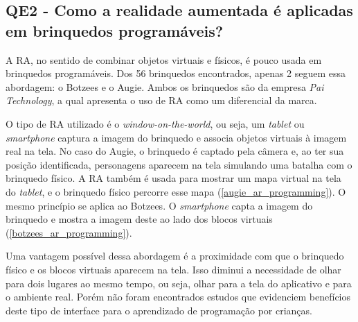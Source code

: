 \subsection{QE2 - Como a realidade aumentada é aplicadas em brinquedos programáveis?}
A \ac{RA}, no sentido de combinar objetos virtuais e físicos, é pouco usada em brinquedos programáveis. Dos 56 brinquedos encontrados, apenas 2 seguem essa abordagem: o Botzees e o Augie. Ambos os brinquedos são da empresa \textit{Pai Technology}, a qual apresenta o uso de \ac{RA} como um diferencial da marca.

O tipo de RA utilizado é o \textit{window-on-the-world}, ou seja, um \textit{tablet} ou \textit{smartphone} captura a imagem do brinquedo e associa objetos virtuais à imagem real na tela. No caso do Augie, o brinquedo é captado pela câmera e, ao ter sua posição identificada, personagens aparecem na tela simulando uma batalha com o brinquedo físico. A RA também é usada para mostrar um mapa virtual na tela do \textit{tablet}, e o brinquedo físico percorre esse mapa (\autoref{augie_ar_programming}). O mesmo princípio se aplica ao Botzees. O \textit{smartphone} capta a imagem do brinquedo e mostra a imagem deste ao lado dos blocos virtuais (\autoref{botzees_ar_programming}).

Uma vantagem possível dessa abordagem é a proximidade com que o brinquedo físico e os blocos virtuais aparecem na tela. Isso diminui a necessidade de olhar para dois lugares ao mesmo tempo, ou seja, olhar para a tela do aplicativo e para o ambiente real. Porém não foram encontrados estudos que evidenciem benefícios deste tipo de interface para o aprendizado de programação por crianças. 

